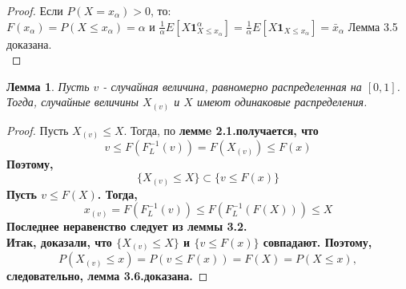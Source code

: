 \documentclass[18pt,a4paper]{article}
\theoremstyle{plain}
\newtheorem{Lemma}{Лемма}[section]
\theoremstyle{definition}
\begin{document}
\begin{proof}
Если $P(X=x_\alpha)>0$, то:\\
$F(x_\alpha) = P(X \le x_\alpha) = \alpha$ и $\frac{1}{\alpha}E[X\mathbf{1}^\alpha_{X\le x_{\alpha}} ] = \frac{1}{\alpha}E[X\mathbf{1}_{X\le x_{\alpha}} ] = \bar{x}_{\alpha} $
Лемма 3.5 доказана.\\
\end{proof}

\begin{Lemma}
Пусть $v$ - случайная величина, равномерно распределенная на $[0,1]$. Тогда, случайные величины $X_{(v)}$ и $X$ имеют одинаковые распределения.
\end{Lemma}
\begin{proof}
Пусть $X_{(v)} \le X$. Тогда, по \bf{леммe 2.1.}\rm получается, что
$$
v \le F(F^{-1}_L (v)) = F(X_{(v)}) \le F(x)
$$
Поэтому, $$\{X_{(v)} \le X \} \subset \{v \le F(x) \}
$$
Пусть $v\le F(X)$. Тогда,
$$
x_{(v)}= F(F^{-1}_L (v)) \le  F(F^{-1}_L (F(X)))\le X
$$
Последнее неравенство следует из \bf{леммы 3.2.}\rm\\
Итак, доказали, что $\{X_{(v)} \le X \} $ и $ \{v \le F(x) \} $ совпадают. Поэтому,
$$P(X_{(v)} \le x) = P(v \le F(x)) = F(X) = P(X \le x), $$ следовательно, \bf{лемма 3.6.}\rm доказана.
\end{proof}
\end{document}
